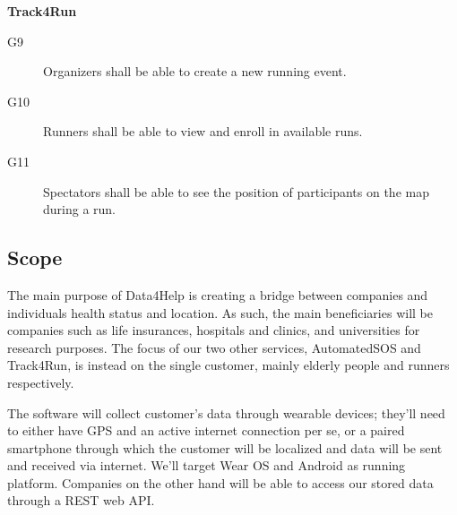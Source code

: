 \documentclass[../main.tex]{subfiles}
\begin{document}
\begin{minipage}{\textwidth}
{\bf Track4Run}
\begin{description}
	\item [G9]   Organizers shall be able to create a new running event.
	\item [G10]  Runners shall be able to view and enroll in available runs.
	\item [G11]  Spectators shall be able to see the position of participants on the map during a run.
\end{description}
\end{minipage}

\subsection{Scope}

The main purpose of Data4Help is creating a bridge between companies and individuals health status and location. As such, the main beneficiaries will be companies such as life insurances, hospitals and clinics, and universities for research purposes.
The focus of our two other services, AutomatedSOS and Track4Run, is instead on the single customer, mainly elderly people and runners respectively.

The software will collect customer's data through wearable devices; they'll need to either have GPS and an active internet connection per se, or a paired smartphone through which the customer will be localized and data will be sent and received via internet. We'll target Wear OS and Android as running platform. Companies on the other hand will be able to access our stored data through a REST web API.

%
%
%
%
%
\end{document}
